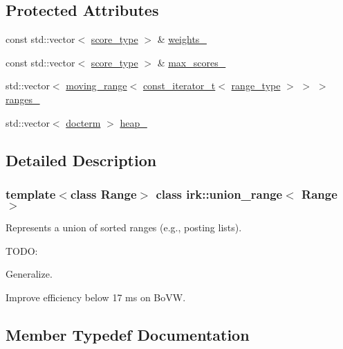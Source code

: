 \subsection*{Protected Attributes}
\begin{DoxyCompactItemize}
\item 
const std\+::vector$<$ \mbox{\hyperlink{classirk_1_1union__range_af728218b976df464ebb051a9e5358e93}{score\+\_\+type}} $>$ \& \mbox{\hyperlink{classirk_1_1union__range_ad593ed1dc96a2caf524511cb3833910c}{weights\+\_\+}}
\item 
const std\+::vector$<$ \mbox{\hyperlink{classirk_1_1union__range_af728218b976df464ebb051a9e5358e93}{score\+\_\+type}} $>$ \& \mbox{\hyperlink{classirk_1_1union__range_accd3b6fdbaccc21952e2586985f2373e}{max\+\_\+scores\+\_\+}}
\item 
std\+::vector$<$ \mbox{\hyperlink{structirk_1_1moving__range}{moving\+\_\+range}}$<$ \mbox{\hyperlink{namespaceirk_a90f7893fdbf95c6dcc2302148eb0bddb}{const\+\_\+iterator\+\_\+t}}$<$ \mbox{\hyperlink{classirk_1_1union__range_aae1621f1e73b1b78990ad11eaa52452b}{range\+\_\+type}} $>$ $>$ $>$ \mbox{\hyperlink{classirk_1_1union__range_a88706eebcc62dd8386d9ad7042d4af2a}{ranges\+\_\+}}
\item 
std\+::vector$<$ \mbox{\hyperlink{structirk_1_1union__range_1_1docterm}{docterm}} $>$ \mbox{\hyperlink{classirk_1_1union__range_a7f29027760890cf7491bb10753f36b61}{heap\+\_\+}}
\end{DoxyCompactItemize}


\subsection{Detailed Description}
\subsubsection*{template$<$class Range$>$\newline
class irk\+::union\+\_\+range$<$ Range $>$}

Represents a union of sorted ranges (e.\+g., posting lists). 

T\+O\+DO\+:
\begin{DoxyItemize}
\item Generalize.
\item Improve efficiency below 17 ms on Bo\+VW. 
\end{DoxyItemize}

\subsection{Member Typedef Documentation}
\mbox{\label{classirk_1_1union__range_aa502a10f2f5c682199072c0ba11a77a9}} 
